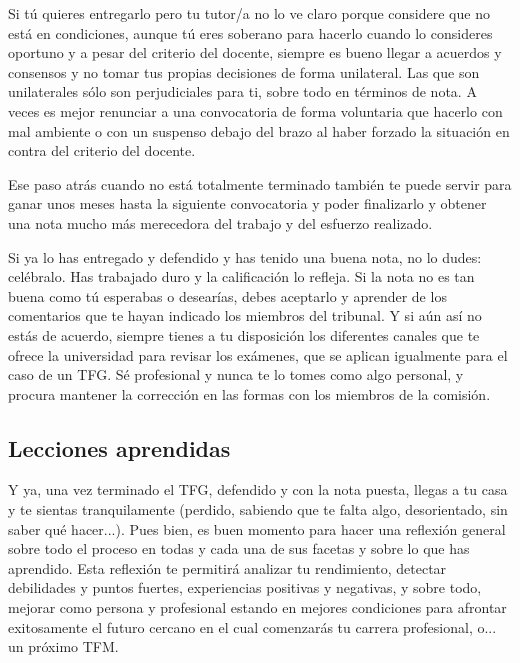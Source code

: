 Si tú quieres entregarlo pero tu tutor/a no lo ve claro porque considere que no está en condiciones, aunque tú eres soberano para hacerlo cuando lo consideres oportuno y a pesar del criterio del docente, siempre es bueno llegar a acuerdos y consensos y no tomar tus propias decisiones de forma unilateral. Las que son unilaterales sólo son perjudiciales para ti, sobre todo en términos de nota. A veces es mejor renunciar a una convocatoria de forma voluntaria que hacerlo con mal ambiente o con un suspenso debajo del brazo al haber forzado la situación en contra del criterio del docente.

Ese paso atrás cuando no está totalmente terminado también te puede servir para ganar unos meses hasta la siguiente convocatoria y poder finalizarlo y obtener una nota mucho más merecedora del trabajo y del esfuerzo realizado. 

Si ya lo has entregado y defendido y has tenido una buena nota, no lo dudes: celébralo. Has trabajado duro y la calificación lo refleja. Si la nota no es tan buena como tú esperabas o desearías, debes aceptarlo y aprender de los comentarios que te hayan indicado los miembros del tribunal. Y si aún así no estás de acuerdo, siempre tienes a tu disposición los diferentes canales que  te ofrece la universidad para revisar los exámenes, que se aplican igualmente para el caso de un TFG. Sé profesional y nunca te lo tomes como algo personal, y procura mantener la corrección en las formas con los miembros de la comisión. %

\subsection{Lecciones aprendidas}

Y ya, una vez terminado el TFG, defendido y con la nota puesta, llegas a tu casa y te sientas tranquilamente (perdido, sabiendo que te falta algo, desorientado, sin saber qué hacer...). Pues bien, es buen momento para hacer una reflexión general sobre todo el proceso en todas y cada una de sus facetas y sobre lo que has aprendido. Esta reflexión te permitirá analizar tu rendimiento, detectar debilidades y puntos fuertes, experiencias positivas y negativas, y sobre todo, mejorar como persona y profesional estando en mejores condiciones para afrontar exitosamente el futuro cercano en el cual comenzarás tu carrera profesional, o... un próximo TFM.

